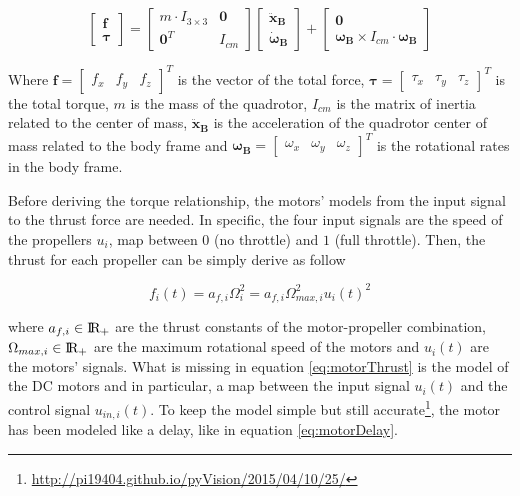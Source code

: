 \begin{equation}
	\begin{bmatrix}
		\mathbf{f} \\
		\boldsymbol{\tau}
	\end{bmatrix}
	=
	\begin{bmatrix}
		m \cdot I_{3\times 3} & \mathbf{0} \\
		\mathbf{0}^T & I_{cm}
	\end{bmatrix}
	\begin{bmatrix}
		\mathbf{\ddot{x}_B} \\
		\boldsymbol{\dot{\omega}_B}
	\end{bmatrix}
	+
	\begin{bmatrix}
		\mathbf{0} \\
		\boldsymbol{\omega_B} \times I_{cm} \cdot \boldsymbol{\omega_B}
	\end{bmatrix}
	\label{eq:NewtonEuler}
\end{equation}

\noindent Where $\mathbf{f} = \begin{bmatrix} f_x & f_y & f_z \end{bmatrix}^T$ is the vector of the total force, $\boldsymbol{\tau} = \begin{bmatrix} \tau_x & \tau_y & \tau_z \end{bmatrix}^T$ is the total torque, $m$ is the mass of the quadrotor, $I_{cm}$ is the matrix of inertia related to the center of mass, $\mathbf{\ddot{x}_B}$ is the acceleration of the quadrotor center of mass related to the body frame and $\boldsymbol{\omega_B} = \begin{bmatrix} \omega_x & \omega_y & \omega_z \end{bmatrix}^T$ is the rotational rates in the body frame.

\noindent Before deriving the torque relationship, the motors' models from the input signal to the thrust force are needed. In specific, the four input signals are the speed of the propellers $u_i$, map between $0$ (no throttle) and $1$ (full throttle). Then, the thrust for each propeller can be simply derive as follow

\begin{equation}
	f_i(t) = a_{f,i} \Omega_i^2 = a_{f,i}\Omega_{max, i}^2 u_i(t)^2
	\label{eq:motorThrust}
\end{equation}

\noindent where $a_{f,i} \in \rm I\!R_+$ are the thrust constants of the motor-propeller combination, $\Omega_{max, i} \in \rm I\!R_+$ are the maximum rotational speed of the motors and $u_i(t)$ are the motors' signals. What is missing in equation \eqref{eq:motorThrust} is the model of the DC motors and in particular, a map between the input signal $u_i(t)$ and the control signal $u_{in,i}(t)$. To keep the model simple but still accurate\footnote{\url{http://pi19404.github.io/pyVision/2015/04/10/25/}}, the motor has been modeled like a delay, like in equation \eqref{eq:motorDelay}.

